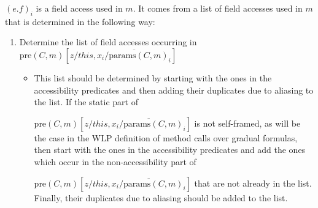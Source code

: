 \documentclass {article}
\newcommand{\fphi}{\widehat{\phi}}
\begin{document}
$(e.f)_i$ is a field access used in $m$. It comes from a list of field accesses used in $m$ that is determined in the following way:
\begin{enumerate}
\item Determine the list of field accesses occurring in $\text{pre}(C,m)\left[z/this, \overline{x_i/\text{params}(C,m)_i}\right]$
	\begin{itemize}
	\item This list should be determined by starting with the ones in the accessibility predicates and then adding their duplicates due to aliasing to the list. If the static part of 
	
	$\text{pre}(C,m)\left[z/this, \overline{x_i/\text{params}(C,m)_i}\right]$ is not self-framed, as will be the case in the WLP definition of method calls over gradual formulas, then start with the ones in the accessibility predicates and add the ones which occur in the non-accessibility part of 
	
	$\text{pre}(C,m)\left[z/this, \overline{x_i/\text{params}(C,m)_i}\right]$ that are not already in the list. Finally, their duplicates due to aliasing should be added to the list.
	\end{itemize}
\end{enumerate} 
\end{document}
